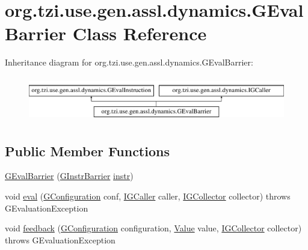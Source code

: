 \hypertarget{classorg_1_1tzi_1_1use_1_1gen_1_1assl_1_1dynamics_1_1_g_eval_barrier}{\section{org.\-tzi.\-use.\-gen.\-assl.\-dynamics.\-G\-Eval\-Barrier Class Reference}
\label{classorg_1_1tzi_1_1use_1_1gen_1_1assl_1_1dynamics_1_1_g_eval_barrier}
}
Inheritance diagram for org.\-tzi.\-use.\-gen.\-assl.\-dynamics.\-G\-Eval\-Barrier\-:\begin{figure}[H]
\begin{center}
\leavevmode
\includegraphics[height=1.978799cm]{classorg_1_1tzi_1_1use_1_1gen_1_1assl_1_1dynamics_1_1_g_eval_barrier}
\end{center}
\end{figure}
\subsection*{Public Member Functions}
\begin{DoxyCompactItemize}
\item 
\hyperlink{classorg_1_1tzi_1_1use_1_1gen_1_1assl_1_1dynamics_1_1_g_eval_barrier_a357f638b973b1fa5ddeb064aa2cfda8b}{G\-Eval\-Barrier} (\hyperlink{classorg_1_1tzi_1_1use_1_1gen_1_1assl_1_1statics_1_1_g_instr_barrier}{G\-Instr\-Barrier} \hyperlink{classorg_1_1tzi_1_1use_1_1gen_1_1assl_1_1dynamics_1_1_g_eval_barrier_a7ef56806ef434bfab29fd9788b294696}{instr})
\item 
void \hyperlink{classorg_1_1tzi_1_1use_1_1gen_1_1assl_1_1dynamics_1_1_g_eval_barrier_a0820f33336d0eabe9537ff54c34076ad}{eval} (\hyperlink{classorg_1_1tzi_1_1use_1_1gen_1_1assl_1_1dynamics_1_1_g_configuration}{G\-Configuration} conf, \hyperlink{interfaceorg_1_1tzi_1_1use_1_1gen_1_1assl_1_1dynamics_1_1_i_g_caller}{I\-G\-Caller} caller, \hyperlink{interfaceorg_1_1tzi_1_1use_1_1gen_1_1assl_1_1dynamics_1_1_i_g_collector}{I\-G\-Collector} collector)  throws G\-Evaluation\-Exception 
\item 
void \hyperlink{classorg_1_1tzi_1_1use_1_1gen_1_1assl_1_1dynamics_1_1_g_eval_barrier_abdc9c54053379a0eca52638b743ca54a}{feedback} (\hyperlink{classorg_1_1tzi_1_1use_1_1gen_1_1assl_1_1dynamics_1_1_g_configuration}{G\-Configuration} configuration, \hyperlink{classorg_1_1tzi_1_1use_1_1uml_1_1ocl_1_1value_1_1_value}{Value} value, \hyperlink{interfaceorg_1_1tzi_1_1use_1_1gen_1_1assl_1_1dynamics_1_1_i_g_collector}{I\-G\-Collector} collector)  throws G\-Evaluation\-Exception 
\end{DoxyCompactItemize}
